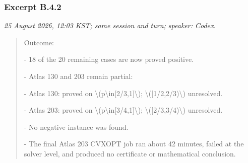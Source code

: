 \subsubsection*{Excerpt B.4.2}
\label{ex:B42}
\noindent\textit{25 August 2026, 12:03 KST; same session and turn; speaker: Codex.}
\begin{quote}\small\ttfamily\raggedright
Outcome:
\par
\medskip
- 18 of the 20 remaining cases are now proved positive.
\par
- Atlas 130 and 203 remain partial:
\par
  - Atlas 130: proved on \textbackslash{}(p\textbackslash{}in[2/3,1]\textbackslash{}); \textbackslash{}([1/2,2/3)\textbackslash{}) unresolved.
\par
  - Atlas 203: proved on \textbackslash{}(p\textbackslash{}in[3/4,1]\textbackslash{}); \textbackslash{}([2/3,3/4)\textbackslash{}) unresolved.
\par
- No negative instance was found.
\par
- The final Atlas 203 CVXOPT job ran about 42 minutes, failed at the solver level, and produced no certificate or mathematical conclusion.
\par
\end{quote}
